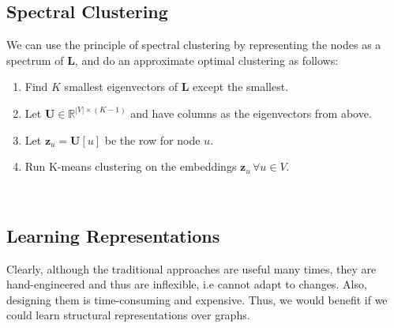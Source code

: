 \subsection{Spectral Clustering}
We can use the principle of spectral clustering by representing the nodes as a spectrum of $\mathbf{L}$, and do an approximate optimal clustering as follows: \\
    \begin{tcolorbox}[space to upper,
	skin=bicolor,
	colbacklower=black!75,
	collower=white,
	title={General Spectral Clustering Algorithm},
	nobeforeafter,
	bottom=0mm,
	height=4.5cm,
	width=4.1in
	]
	\begin{enumerate}
		\item Find $K$ smallest eigenvectors of $\mathbf{L}$ except the smallest.
		\item Let $\mathbf{U} \in\mathbb{R}^{|V| \times (K-1)}$ and have columns as the eigenvectors from above.
		\item Let $\mathbf{z}_u = \mathbf{U}[u]$ be the row for node $u$.
		\item Run K-means clustering on the embeddings $\mathbf{z}_u \, \forall u\in V$.
	\end{enumerate}
\end{tcolorbox}\\
\subsection{Learning Representations}
Clearly, although the traditional approaches are useful many times, they are hand-engineered and thus are inflexible, i.e cannot adapt to changes. Also, designing them is time-consuming and expensive. Thus, we would benefit if we could learn structural representations over graphs.


